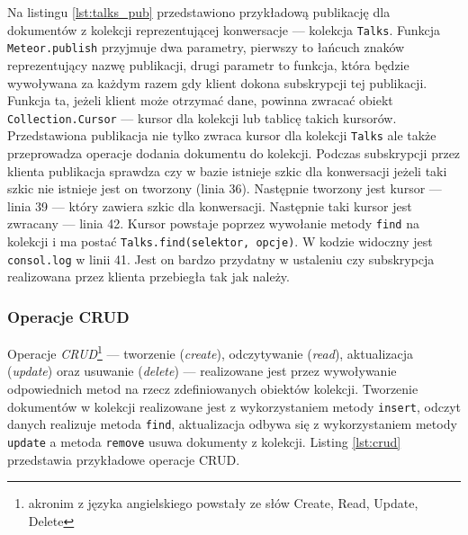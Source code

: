 Na listingu \ref{lst:talks_pub} przedstawiono przykładową publikację dla dokumentów z kolekcji reprezentującej konwersacje --- kolekcja \verb|Talks|. Funkcja \verb|Meteor.publish| przyjmuje dwa parametry, pierwszy to łańcuch znaków reprezentujący nazwę publikacji, drugi parametr to funkcja, która będzie wywoływana za każdym razem gdy klient dokona subskrypcji tej publikacji. Funkcja ta, jeżeli klient może otrzymać dane, powinna zwracać obiekt \verb|Collection.Cursor| --- kursor dla kolekcji lub tablicę takich kursorów. Przedstawiona publikacja nie tylko zwraca kursor dla kolekcji \verb|Talks| ale także przeprowadza operacje dodania dokumentu do kolekcji. Podczas subskrypcji przez klienta publikacja sprawdza czy w bazie istnieje szkic dla konwersacji jeżeli taki szkic nie istnieje jest on tworzony (linia 36). Następnie tworzony jest kursor --- linia 39 --- który zawiera szkic dla konwersacji. Następnie taki kursor jest zwracany --- linia 42. Kursor powstaje poprzez wywołanie metody \verb|find| na kolekcji i ma postać \verb|Talks.find(selektor, opcje)|. W kodzie widoczny jest \verb|consol.log| w linii 41. Jest on bardzo przydatny w ustaleniu czy subskrypcja realizowana przez klienta przebiegła tak jak należy.

  \subsubsection{Operacje CRUD}
Operacje \emph{CRUD}\footnote{akronim z języka angielskiego powstały ze słów Create, Read, Update, Delete} --- tworzenie (\textit{create}), odczytywanie (\textit{read}), aktualizacja (\textit{update}) oraz usuwanie (\textit{delete}) --- realizowane jest przez wywoływanie odpowiednich metod na rzecz zdefiniowanych obiektów kolekcji. Tworzenie dokumentów w kolekcji realizowane jest z wykorzystaniem metody \verb|insert|, odczyt danych realizuje metoda \verb|find|, aktualizacja odbywa się z wykorzystaniem metody \verb|update| a metoda \verb|remove| usuwa dokumenty z kolekcji. Listing \ref{lst:crud} przedstawia przykładowe operacje CRUD.

